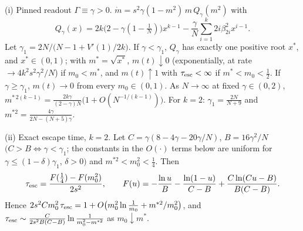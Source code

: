\begin{theorem}[Finite-context trap; population flow, $\sg=\sg_k$, $k\ge2$]\label{thm:A}
\textup{(i) Pinned readout $\Gamma\equiv\gamma>0$.} $\dot m=s^2\gamma(1-m^2)\,m\,Q_\gamma(m^2)$ with
\[
Q_\gamma(x)=2k\big(2-\gamma(1-\tfrac1N)\big)x^{k-1}-\frac{\gamma}{N}\sum_{i=1}^{k}2i\beta_{2i}^2x^{i-1}.
\]
Let $\gamma_1=2N/\big(N-1+V'(1)/2k\big)$. If $\gamma<\gamma_1$, $Q_\gamma$ has exactly one positive root $x^*$, and $x^*\in(0,1)$; with $m^*=\sqrt{x^*}$,
$m(t)\downarrow0$ (exponentially, at rate $\to4k^2s^2\gamma^2/N$) if $m_0<m^*$, and $m(t)\uparrow1$ with $\tau_{\rm esc}<\infty$ if $m^*<m_0<\frac12$. If
$\gamma\ge\gamma_1$, $m(t)\to0$ from every $m_0\in(0,1)$. As $N\to\infty$ at fixed $\gamma\in(0,2)$,
$m^{*\,2(k-1)}=\frac{2k\gamma}{(2-\gamma)N}\big(1+O(N^{-1/(k-1)})\big)$. For $k=2$: $\gamma_1=\frac{2N}{N+9}$ and $m^{*2}=\frac{4\gamma}{2N-(N+5)\gamma}$.

\textup{(ii) Exact escape time, $k=2$.} Let $C=\gamma(8-4\gamma-20\gamma/N)$, $B=16\gamma^2/N$ $(C>B\iff\gamma<\gamma_1$; the constants in the $O(\cdot)$ terms below are uniform for $\gamma\le(1-\delta)\gamma_1$, $\delta>0)$ and $m^{*2}<m_0^2<\frac14$. Then
\[
\tau_{\rm esc}=\frac{F(\tfrac14)-F(m_0^2)}{2s^2},\qquad F(u)=-\frac{\ln u}{B}-\frac{\ln(1-u)}{C-B}+\frac{C\ln(Cu-B)}{B(C-B)} .
\]
Hence $2s^2Cm_0^2\,\tau_{\rm esc}=1+O\big(m_0^2\ln\frac1{m_0}+m^{*2}/m_0^2\big)$, and $\tau_{\rm esc}\sim\frac{C}{2s^2B(C-B)}\ln\frac1{m_0^2-m^{*2}}$ as $m_0\downarrow m^*$.


\end{theorem}
